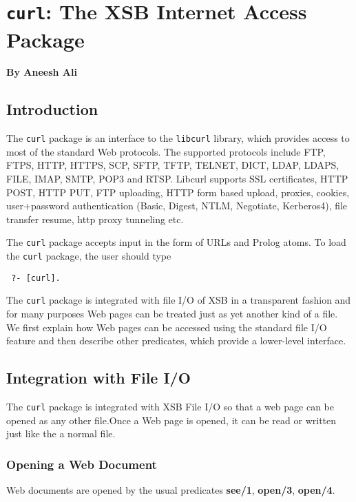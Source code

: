 
\chapter{{\tt curl}: The XSB Internet Access Package}

\begin{center}
  {\Large {\bf By Aneesh Ali}}
\end{center}



\section{Introduction}

The {\tt curl} package is an interface to the {\tt libcurl}  library,
which provides access to most of the standard Web protocols.
The supported protocols include
FTP, FTPS, HTTP, HTTPS, SCP, SFTP, TFTP, TELNET, DICT, LDAP, LDAPS, FILE, IMAP, SMTP, POP3 and RTSP. Libcurl supports SSL certificates, HTTP POST, HTTP PUT, FTP uploading, HTTP form based upload, proxies, cookies, user+password authentication (Basic, Digest, NTLM, Negotiate, Kerberos4), file transfer resume, http proxy tunneling etc. 


The {\tt curl} package accepts input in the form of URLs and Prolog
atoms. To load the {\tt curl} package, the user should type
\begin{verbatim}
 ?- [curl].  
\end{verbatim}
The {\tt curl} package is integrated with file I/O of XSB in a transparent
fashion and for many purposes Web pages can be treated just as yet another
kind of a file. We first explain how Web pages can be accessed
using the standard file I/O feature and then describe other predicates,
which provide a lower-level interface.

\section{Integration with File I/O}

The {\tt curl} package is integrated with XSB File I/O so that a web page
can be opened as any other file.Once a Web page is opened, it can be read
or written just like the a normal file.


\subsection{Opening a Web Document}

Web documents are opened by the usual predicates {\bf see/1}, {\bf open/3},
{\bf open/4}.

